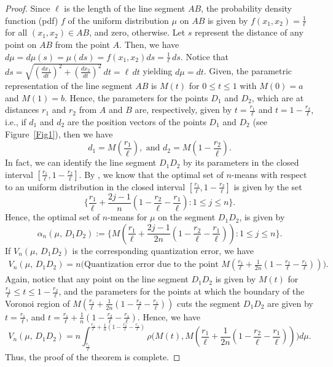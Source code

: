 \documentclass[12pt]{amsart}
\theoremstyle{plain}
\theoremstyle{definition}
\newcommand{\ga}{\alpha}
\newcommand{\te}{\text}%
\begin{document}
\begin{proof}
Since $\ell$ is the length of the line segment $AB$, the probability density function (pdf) $f$ of the uniform distribution $\mu$ on $AB$ is given by $f(x_1, x_2)=\frac 1{\ell}$ for all $(x_1, x_2)\in AB$, and zero, otherwise.
Let $s$ represent the distance of any point on $AB$ from the point $A$. Then, we have $d\mu=d\mu(s)=\mu(ds)=f(x_1, x_2) ds=\frac 1 {\ell} \,ds$. Notice that $ds=\sqrt{(\frac {dx_1}{dt})^2 +(\frac {dx_2}{dt})^2}\,dt=\ell \,dt$ yielding $d\mu=dt$. Given, the parametric representation of the line segment $AB$ is $M(t)$ for $0\leq t\leq 1$ with $M(0)=a$ and $M(1)=b$. Hence, the parameters for the points $D_1$ and $D_2$, which are at distances $r_1$ and $r_2$ from $A$ and $B$ are, respectively, given by $t=\frac {r_1}{\ell}$ and $t=1-\frac {r_2}{\ell}$, i.e., if $d_1$ and $d_2$ are the position vectors of the points $D_1$ and $D_2$ (see Figure~\ref{Fig1}), then we have
\[d_1=M(\frac {r_1}{\ell}), \te{ and } d_2=M(1-\frac {r_2}{\ell}).\]
In fact, we can identify the line segment $D_1D_2$ by its parameters in the closed interval $[\frac {r_1}{\ell}, 1-\frac {r_2}{\ell}].$ By \cite{RR2}, we know that the optimal set of $n$-means with respect to an uniform distribution in the closed interval  $[\frac {r_1}{\ell}, 1-\frac {r_2}{\ell}]$ is given by the set
\[\Big \{\frac {r_1}{\ell}+\frac {2j-1}{n}(1-\frac {r_2}{\ell}-\frac {r_1}{\ell}) : 1\leq j\leq n\Big\}.\]
Hence, the optimal set of $n$-means for $\mu$ on the segment $D_1D_2$, is given by
\[\ga_n(\mu,  \, D_1D_2):=\Big\{M(\frac {r_1}{\ell}+\frac {2j-1}{2n} (1-\frac{r_2}{\ell}-\frac{r_1}{\ell})) : 1\leq j\leq n \Big\}.\]
If $V_n(\mu, \, D_1D_2)$ is the corresponding quantization error, we have
\begin{align*} V_n(\mu, \, D_1D_2)=n\Big(\te{Quantization error due to the point } M(\frac {r_1}{\ell}+\frac {1}{2n} (1-\frac{r_2}{\ell}-\frac{r_1}{\ell}))\Big).
\end{align*}
Again, notice that any point on the line segment $D_1D_2$ is given by $M(t)$ for $\frac{r_1}{\ell}\leq t\leq 1-\frac{r_2}{\ell}$, and the parameters for the points at which the boundary of the Voronoi region of $M(\frac {r_1}{\ell}+\frac {1}{2n} (1-\frac{r_2}{\ell}-\frac{r_1}{\ell}))$ cuts the segment $D_1D_2$ are given by $t=\frac{r_1}{\ell}$, and $t=\frac {r_1}{\ell}+\frac {1}{n} (1-\frac{r_2}{\ell}-\frac{r_1}{\ell})$. Hence, we have
\[V_n(\mu, \, D_1D_2)=n \int_{\frac {r_1}{\ell}}^{\frac {r_1}{\ell}+\frac {1}{n} (1-\frac{r_2}{\ell}-\frac{r_1}{\ell})}\rho\Big(M(t), M(\frac {r_1}{\ell}+\frac {1}{2n} (1-\frac{r_2}{\ell}-\frac{r_1}{\ell}))\Big) d\mu.\]
Thus, the proof of the theorem is complete.
\end{proof}
\end{document}
